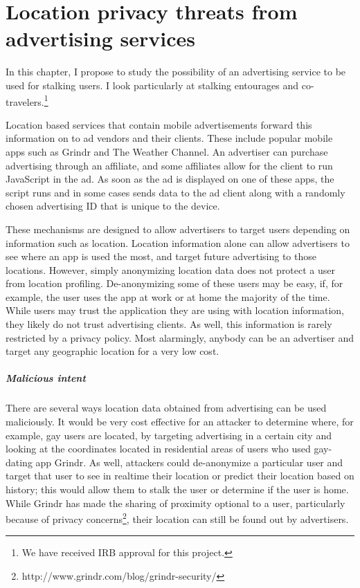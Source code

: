 \chapter{Location privacy threats from advertising services}

In this chapter, I propose to study the possibility of an advertising service to be used for stalking users. I look particularly at stalking entourages and co-travelers.\footnote{We have received IRB approval for this project.}

Location based services that contain mobile advertisements forward this information on to ad vendors and their clients. These include popular mobile apps such as Grindr and The Weather Channel. An advertiser can purchase advertising through an affiliate, and some affiliates allow for the client to run JavaScript in the ad. As soon as the ad is displayed on one of these apps, the script runs and in some cases sends data to the ad client along with a randomly chosen advertising ID that is unique to the device.

These mechanisms are designed to allow advertisers to target users depending on information such as location. Location information alone can allow advertisers to see where an app is used the most, and target future advertising to those locations. However, simply anonymizing location data does not protect a user from location profiling. De-anonymizing some of these users may be easy, if, for example, the user uses the app at work or at home the majority of the time. While users may trust the application they are using with location information, they likely do not trust advertising clients. As well, this information is rarely restricted by a privacy policy. Most alarmingly, anybody can be an advertiser and target any geographic location for a very low cost.

\paragraph*{Malicious intent}
There are several ways location data obtained from advertising can be used maliciously. It would be very cost effective for an attacker to determine where, for example, gay users are located, by targeting advertising in a certain city and looking at the coordinates located in residential areas of users who used gay-dating app Grindr. As well, attackers could de-anonymize a particular user and target that user to see in realtime their location or predict their location based on history; this would allow them to stalk the user or determine if the user is home. While Grindr has made the sharing of proximity optional to a user, particularly because of privacy concerns\footnote{http://www.grindr.com/blog/grindr-security/}, their location can still be found out by advertisers.

